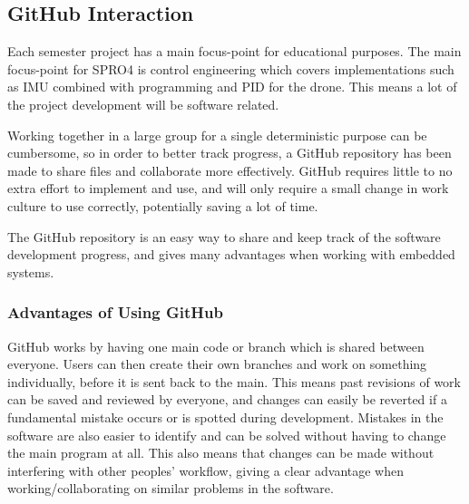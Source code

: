 \subsection{GitHub Interaction}
Each semester project has a main focus-point for educational purposes. The main focus-point for SPRO4 is control engineering which covers implementations such as IMU combined with programming and PID for the drone. This means a lot of the project development will be software related.

Working together in a large group for a single deterministic purpose can be cumbersome, so in order to better track progress, a GitHub repository has been made to share files and collaborate more effectively. GitHub requires little to no extra effort to implement and use, and will only require a small change in work culture to use correctly, potentially saving a lot of time.

 The GitHub repository is an easy way to share and keep track of the software development progress, and gives many advantages when working with embedded systems. 

\subsubsection{Advantages of Using GitHub}
GitHub works by having one main code or branch which is shared between everyone. Users can then create their own branches and work on something individually, before it is sent back to the main. This means past revisions of work can be saved and reviewed by everyone, and changes can easily be reverted if a fundamental mistake occurs or is spotted during development. Mistakes in the software are also easier to identify and can be solved without having to change the main program at all. This also means that changes can be made without interfering with other peoples' workflow, giving a clear advantage when working/collaborating on similar problems in the software.\cite{benefitsGithub}
